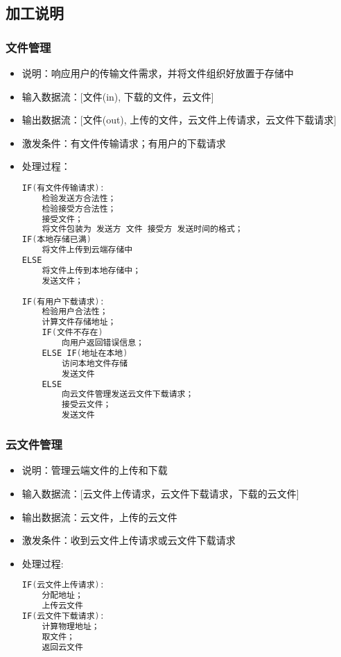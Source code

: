         \subsection{加工说明}
            \subsubsection{文件管理}
            \begin{itemize}
                \item 说明：响应用户的传输文件需求，并将文件组织好放置于存储中
                \item 输入数据流：[文件(in), 下载的文件，云文件]
                \item 输出数据流：[文件(out), 上传的文件，云文件上传请求，云文件下载请求]
                \item 激发条件：有文件传输请求；有用户的下载请求
                \item 处理过程：
\begin{lstlisting}[language=C, caption=文件管理, label={code:first-code}]
IF(有文件传输请求):
    检验发送方合法性；
    检验接受方合法性；
    接受文件；
    将文件包装为 发送方 文件 接受方 发送时间的格式；
IF(本地存储已满) 
    将文件上传到云端存储中
ELSE 
    将文件上传到本地存储中；
    发送文件；
                
IF(有用户下载请求):
    检验用户合法性；
    计算文件存储地址；
    IF(文件不存在) 
        向用户返回错误信息；
    ELSE IF(地址在本地)
        访问本地文件存储
        发送文件
    ELSE 
        向云文件管理发送云文件下载请求；
        接受云文件；
        发送文件
\end{lstlisting}
            \end{itemize}    
            \subsubsection{云文件管理}
            \begin{itemize}
                \item 说明：管理云端文件的上传和下载
                \item 输入数据流：[云文件上传请求，云文件下载请求，下载的云文件]
                \item 输出数据流：云文件，上传的云文件
                \item 激发条件：收到云文件上传请求或云文件下载请求
                \item 处理过程: 
\begin{lstlisting}[language=C, caption=云文件管理, label={code:first-code}]
IF(云文件上传请求):
    分配地址；
    上传云文件
IF(云文件下载请求):
    计算物理地址；
    取文件；
    返回云文件
\end{lstlisting}
            \end{itemize}
